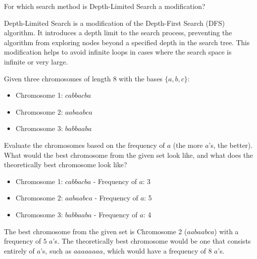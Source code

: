 \documentclass[12pt]{article}
\begin{document}
    \begin{ejercicio}
        For which search method is Depth-Limited Search a modification?

        Depth-Limited Search is a modification of the Depth-First Search (DFS) algorithm. It introduces a depth limit to the search process, preventing the algorithm from exploring nodes beyond a specified depth in the search tree. This modification helps to avoid infinite loops in cases where the search space is infinite or very large.
    \end{ejercicio}

    \begin{ejercicio}
        Given three chromosomes of length $8$ with the bases $\{a, b, c\}$:
        \begin{itemize}
            \item Chromosome 1: $cabbacba$
            \item Chromosome 2: $aabaabca$
            \item Chromosome 3: $babbaaba$
        \end{itemize}
        Evaluate the chromosomes based on the frequency of $a$ (the more $a$'s, the better). What would the best chromosome from the given set look like, and what does the theoretically best chromosome look like?

        \begin{itemize}
            \item Chromosome 1: $cabbacba$ - Frequency of $a$: 3
            \item Chromosome 2: $aabaabca$ - Frequency of $a$: 5
            \item Chromosome 3: $babbaaba$ - Frequency of $a$: 4
        \end{itemize}

        The best chromosome from the given set is Chromosome 2 ($aabaabca$) with a frequency of $5$ $a$'s. The theoretically best chromosome would be one that consists entirely of $a$'s, such as $aaaaaaaa$, which would have a frequency of $8$ $a$'s.
    \end{ejercicio}
\end{document}
